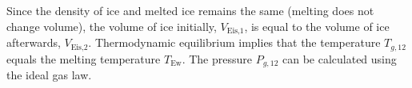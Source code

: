 Since the density of ice and melted ice remains the same (melting does not change volume), the volume of ice initially, \( V_{\text{Eis,1}} \), is equal to the volume of ice afterwards, \( V_{\text{Eis,2}} \). Thermodynamic equilibrium implies that the temperature \( T_{g,12} \) equals the melting temperature \( T_{\text{Ew}} \). The pressure \( P_{g,12} \) can be calculated using the ideal gas law.